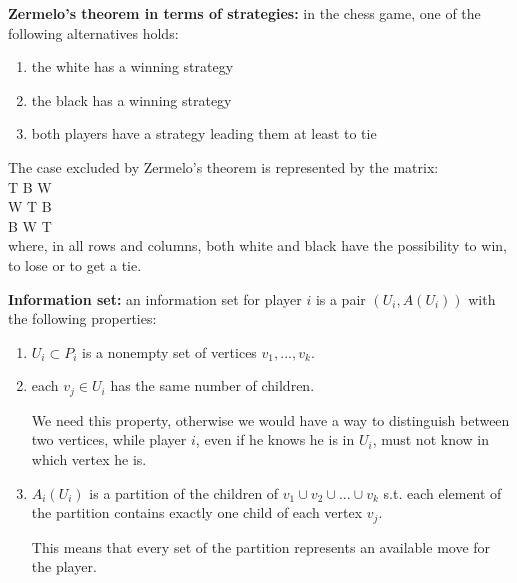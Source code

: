\documentclass[pt11,a4paper,twoside,reqno,openright]{paper}
\begin{document}
\bigskip
\noindent \textbf{Zermelo's theorem in terms of strategies:} in the chess game, 
one of the following alternatives holds:
\begin{enumerate}
	\item the white has a winning strategy
	\item the black has a winning strategy
	\item both players have a strategy leading them at least to tie
\end{enumerate}
The case excluded by Zermelo's theorem is represented by the matrix:\\
T \hspace{.6cm} B \hspace{.6cm}	W\\
W \hspace{.6cm} T \hspace{.6cm} B\\
B \hspace{.6cm}	W \hspace{.6cm}	T\\
where, in all rows and columns, both white and black have the possibility to 
win, to lose or to get a tie.

\bigskip
\noindent \textbf{Information set:} an information set for player $i$ is a pair 
$(U_i,A(U_i))$ with the following properties:
\begin{enumerate}
	\item $U_i \subset P_i$ is a nonempty set of vertices $v_1,...,v_k$.
	\item each $v_j \in U_i$ has the same number of children.

	\noindent We need this property, otherwise we would have a way to 
	distinguish between two vertices, while player $i$, even if he knows he is 
	in $U_i$, must not know in which vertex he is.

	\item $A_i(U_i)$ is a partition of the children of $v_1 \cup v_2 \cup ... 
	\cup v_k$ s.t. each element of the partition contains exactly one child of 
	each vertex $v_j$.

	\noindent This means that every set of the partition represents an available 
	move for the player.
\end{enumerate}
\end{document}
